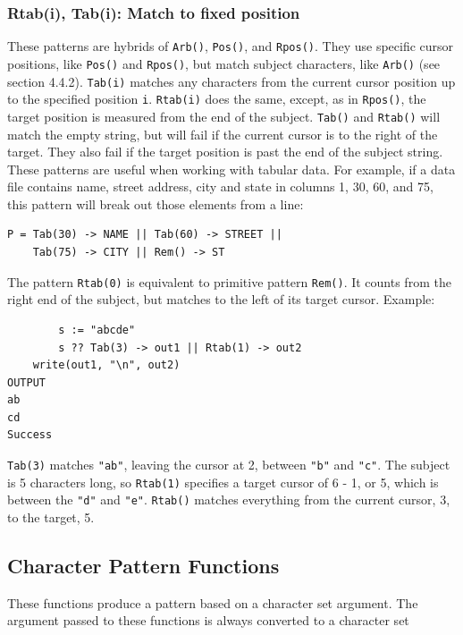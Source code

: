 \documentclass[letterpaper,12pt]{article}
\begin{document}
\subsubsection{Rtab(i), Tab(i): Match to fixed position}

These patterns are hybrids of {\tt Arb()}, {\tt Pos()}, and {\tt Rpos()}.
They use specific cursor positions, like {\tt Pos()} and {\tt Rpos()},
but match subject characters, like {\tt Arb()} (see section 4.4.2).
{\tt Tab(i)} matches any characters from the
current cursor position up to the specified position {\tt i}. {\tt Rtab(i)}
does the same, except, as in {\tt Rpos()}, the target position is measured
from the end of the subject.  {\tt Tab()} and {\tt Rtab()} will match the
empty string, but
will fail if the current cursor is to the right of the target. They
also fail if the target position is past the end of the subject
string.  These patterns are useful when working with tabular data. For
example, if a data file contains name, street address, city and state
in columns 1, 30, 60, and 75, this pattern will break out those
elements from a line:

\begin{verbatim}
P = Tab(30) -> NAME || Tab(60) -> STREET || 
	Tab(75) -> CITY || Rem() -> ST
\end{verbatim}

The pattern {\tt Rtab(0)} is equivalent to primitive pattern {\tt Rem()}.
It counts from the right end of the subject, but matches to the left of
its target cursor. Example:

\begin{verbatim}
        s := "abcde"
        s ?? Tab(3) -> out1 || Rtab(1) -> out2
	write(out1, "\n", out2)
OUTPUT
ab
cd
Success
\end{verbatim}


{\tt Tab(3)} matches \texttt{"ab"}, leaving the cursor at 2, between
\texttt{"b"} and \texttt{"c"}. The subject is 5 characters long, so
{\tt Rtab(1)} specifies a target cursor of 6 - 1, or 5, which is between
the {\tt "d"} and {\tt "e"}.
{\tt Rtab()} matches everything from the current cursor,
3, to the target, 5.

\subsection{Character Pattern Functions}

These functions produce a pattern based on a character set
argument. The argument passed to these functions is always converted
to a character set
\end{document}
